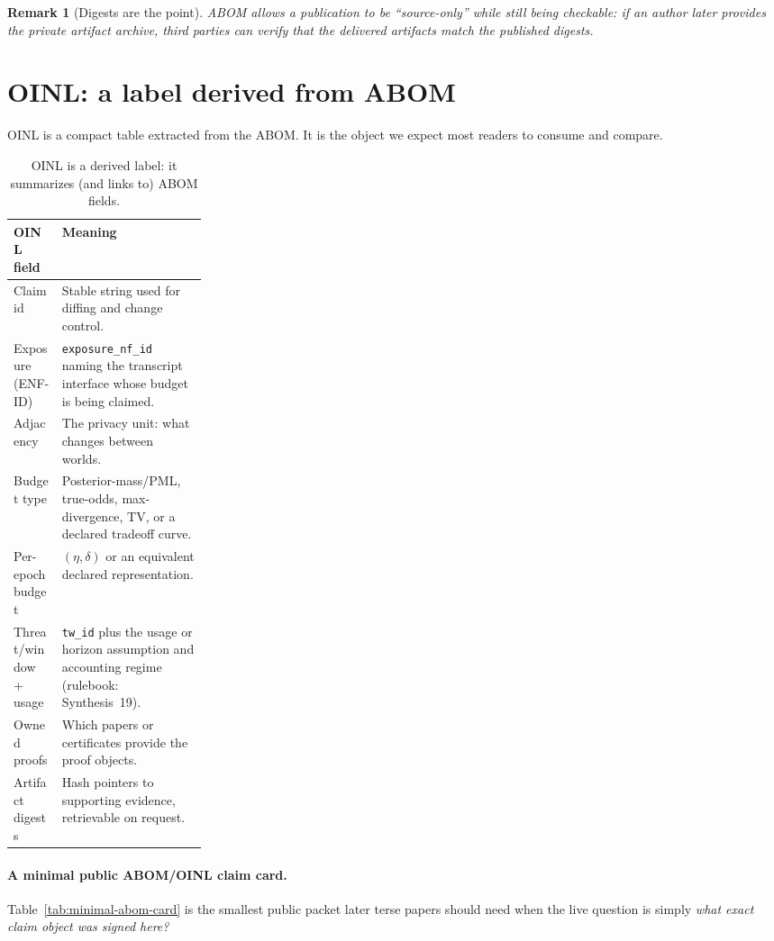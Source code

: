 \documentclass[11pt]{article}
\newtheorem{remark}{Remark}
\begin{document}
\begin{remark}[Digests are the point]
ABOM allows a publication to be ``source-only'' while still being checkable: if an author later provides the private artifact archive, third parties can verify that the delivered artifacts match the published digests.
\end{remark}

\section{OINL: a label derived from ABOM}
OINL is a compact table extracted from the ABOM.
It is the object we expect most readers to consume and compare.

\begin{table}[t]
\centering
\small
\begin{tabularx}{0.97\linewidth}{@{}p{0.25\linewidth}X@{}}
\toprule
\textbf{OINL field} & \textbf{Meaning}\\
\midrule
Claim id & Stable string used for diffing and change control. \\
Exposure (ENF-ID) & \texttt{exposure\_nf\_id} naming the transcript interface whose budget is being claimed. \\
Adjacency & The privacy unit: what changes between worlds. \\
Budget type & Posterior-mass/PML, true-odds, max-divergence, TV, or a declared tradeoff curve. \\
Per-epoch budget & $(\eta,\delta)$ or an equivalent declared representation. \\
Threat/window + usage & \texttt{tw\_id} plus the usage or horizon assumption and accounting regime (rulebook: Synthesis~19). \\
Owned proofs & Which papers or certificates provide the proof objects. \\
Artifact digests & Hash pointers to supporting evidence, retrievable on request. \\
\bottomrule
\end{tabularx}
\caption{OINL is a derived label: it summarizes (and links to) ABOM fields.}
\end{table}

\paragraph{A minimal public ABOM/OINL claim card.}
Table~\ref{tab:minimal-abom-card} is the smallest public packet later terse papers should need when the live question is simply \emph{what exact claim object was signed here?}
\end{document}
